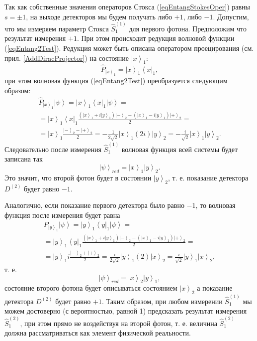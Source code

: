 Так как собственные значения операторов Стокса
(\ref{eqEntangStokesOper}) равны $s = \pm 1$, на выходе детекторов мы
будем получать либо $+1$, либо $-1$. Допустим, что мы измеряем параметр
Стокса $\hat{S}_1^{(1)}$ для первого фотона. Предположим что
результат измерения $+1$. При этом происходит редукция волновой функции
(\ref{eqEntang2Test}). Редукция может быть описана оператором
проецирования (см. прил. \ref{AddDiracProjector}) на состояние
$\left|x\right>_1$:
\[
\hat{P}_{\left|x\right>_1} = \left|x\right>_1\left<x\right|_1,
\]
при этом волновая функция
(\ref{eqEntang2Test}) преобразуется следующим образом:
\begin{eqnarray}
  \hat{P}_{\left|x\right>_1}\left|\psi\right> =
  \left|x\right>_1\left<x\right|_1 \left|\psi\right> =
  \nonumber \\
    =
  \left|x\right>_1\left<x\right|_1
  \frac{
    \left( \left|x\right>_1 + i \left|y\right>_1 \right)\left| - \right>_2 -
    \left( \left|x\right>_1 - i \left|y\right>_1 \right)\left| + \right>_2
  }{2} =
  \nonumber \\
  =
  \left|x\right>_1
  \frac{\left| - \right>_2 - \left| + \right>_2}{2} = -
  \frac{1}{2\sqrt{2}}\left|x\right>_1 \left(2 i\right)
  \left|y\right>_2 = -
  \frac{i}{\sqrt{2}}\left|x\right>_1\left|y\right>_2.
\nonumber
\end{eqnarray}
Следовательно после измерения $\hat{S}_1^{(1)}$ волновая функция всей
системы будет записана так
\[
\left|\psi\right>_{red} = \left|x\right>_1\left|y\right>_2.
\]
Это значит, что второй фотон будет в состоянии $\left|y\right>_2$,
т. е.  показание детектора $D^{(2)}$ будет равно $-1$.

Аналогично, если показание первого детектора было равно $-1$, то
волновая функция после измерения будет равна
\begin{eqnarray}
  P_{\left|y\right>_1}\left|\psi\right> =
  \left|y\right>_1\left<y\right|_1 \left|\psi\right> =
  \nonumber \\
  =
  \left|y\right>_1\left<y\right|_1
  \frac{
    \left( \left|x\right>_1 + i \left|y\right>_1 \right)\left| - \right>_2 -
    \left( \left|x\right>_1 - i \left|y\right>_1 \right)\left| + \right>_2
  }{2} =
  \nonumber \\
  =
  \left|y\right>_1 i 
  \frac{\left| - \right>_2 + \left| + \right>_2}{2} =
  \frac{i}{2\sqrt{2}}\left|y\right>_1 \left(2\right)
  \left|x\right>_2 =
  \frac{i}{\sqrt{2}}\left|y\right>_1\left|x\right>_2,
  \nonumber
\end{eqnarray}
т. е.
\[
\left|\psi\right>_{red} = \left|x\right>_2\left|y\right>_1,
\]
состояние второго фотона будет описываться состоянием
$\left|x\right>_2$ а показание детектора $D^{(2)}$ будет равно $+1$.
Таким образом, при любом измерении $\hat{S}_1^{(1)}$ мы можем
достоверно (с вероятностью, равной 1) предсказать результат измерения
$\hat{S}_1^{(2)}$, при этом прямо не воздействуя на второй фотон, т. е.
величина $\hat{S}_1^{(2)}$ должна рассматриваться как элемент
физической реальности.


